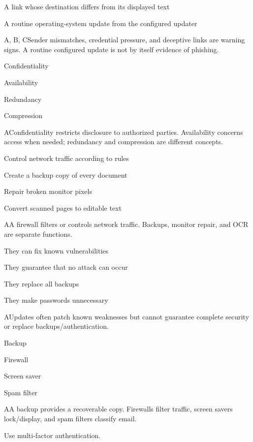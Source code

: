 \begin{enumerate}[label=\textbf{Q\arabic*.}, leftmargin=*]
{   \item A link whose destination differs from its displayed text
   \item A routine operating-system update from the configured updater}
  {A, B, C}{Sender mismatches, credential pressure, and deceptive links are warning signs. A routine configured update is not by itself evidence of phishing.}
\fi
\ifnum{}
  {\item Confidentiality
   \item Availability
   \item Redundancy
   \item Compression}
  {A}{Confidentiality restricts disclosure to authorized parties. Availability concerns access when needed; redundancy and compression are different concepts.}
  {\item Control network traffic according to rules
   \item Create a backup copy of every document
   \item Repair broken monitor pixels
   \item Convert scanned pages to editable text}
  {A}{A firewall filters or controls network traffic. Backups, monitor repair, and OCR are separate functions.}
  {\item They can fix known vulnerabilities
   \item They guarantee that no attack can occur
   \item They replace all backups
   \item They make passwords unnecessary}
  {A}{Updates often patch known weaknesses but cannot guarantee complete security or replace backups/authentication.}
  {\item Backup
   \item Firewall
   \item Screen saver
   \item Spam filter}
  {A}{A backup provides a recoverable copy. Firewalls filter traffic, screen savers lock/display, and spam filters classify email.}
  {\item Use multi-factor authentication.
}
\end{enumerate}
